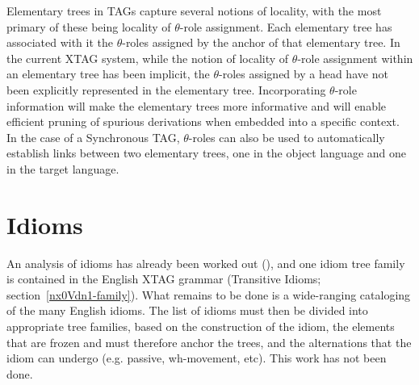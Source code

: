 Elementary trees in TAGs capture several notions of locality, with the most
primary of these being locality of $\theta$-role assignment.  Each elementary
tree has associated with it the $\theta$-roles assigned by the anchor of that
elementary tree.  In the current XTAG system, while the notion of locality of
$\theta$-role assignment within an elementary tree has been implicit, the
$\theta$-roles assigned by a head have not been explicitly represented in the
elementary tree. Incorporating $\theta$-role information will make the
elementary trees more informative and will enable efficient pruning of spurious
derivations when embedded into a specific context.  In the case of a
Synchronous TAG, $\theta$-roles can also be used to automatically establish
links between two elementary trees, one in the object language and one in the
target language.


\section{Idioms}

An analysis of idioms has already been worked out (\cite{AS89}), and one idiom
tree family is contained in the English XTAG grammar (Transitive Idioms;
section~\ref{nx0Vdn1-family}).  What remains to be done is a wide-ranging
cataloging of the many English idioms.  The list of idioms must then be divided
into appropriate tree families, based on the construction of the idiom, the
elements that are frozen and must therefore anchor the trees, and the
alternations that the idiom can undergo (e.g. passive, wh-movement, etc).  This
work has not been done.






















